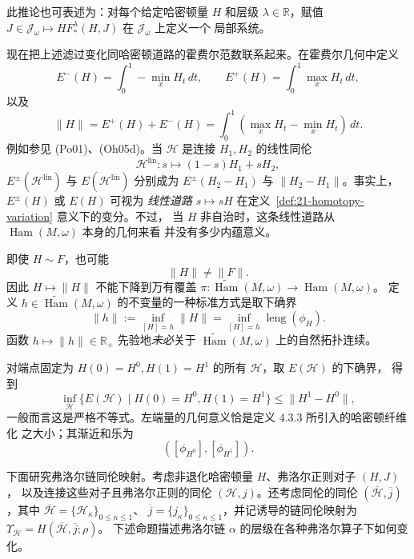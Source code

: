 \begin{remark}
\label{rem:21-filtered-local-system}
此推论也可表述为：对每个给定哈密顿量 $H$ 和层级 $\lambda\in\mathbb R$，赋值
$J\in\mathcal J_\omega\mapsto HF_*^\lambda(H,J)$ 在 $\mathcal J_\omega$ 上定义一个
局部系统。
\end{remark}

现在把上述滤过变化同哈密顿道路的霍费尔范数联系起来。在霍费尔几何中定义
\[
 E^-(H)=\int_0^1-\min_xH_t\,dt,\qquad
 E^+(H)=\int_0^1\max_xH_t\,dt,
\]
以及
\[
 \lVert H\rVert=E^+(H)+E^-(H)
 =\int_0^1(\max_xH_t-\min_xH_t)\,dt.
\]
例如参见 (Po01)、(Oh05d)。当 $\mathcal H$ 是连接 $H_1,H_2$ 的线性同伦
\[
 \mathcal H^{\mathrm{lin}}:s\longmapsto(1-s)H_1+sH_2,
\]
$E^\pm(\mathcal H^{\mathrm{lin}})$ 与 $E(\mathcal H^{\mathrm{lin}})$ 分别成为
$E^\pm(H_2-H_1)$ 与 $\lVert H_2-H_1\rVert$。事实上，$E^\pm(H)$ 或 $E(H)$ 可视为
\emph{线性道路} $s\mapsto sH$ 在定义~\ref{def:21-homotopy-variation} 意义下的变分。不过，
当 $H$ 非自治时，这条线性道路从 $\operatorname{Ham}(M,\omega)$ 本身的几何来看
并没有多少内蕴意义。

\begin{remark}
\label{rem:21-hofer-norm-universal-cover}
即使 $H\sim F$，也可能
\[
 \lVert H\rVert\neq\lVert F\rVert.
\]
因此 $H\mapsto\lVert H\rVert$ 不能下降到万有覆盖
$\pi:\widetilde{\operatorname{Ham}}(M,\omega)\to\operatorname{Ham}(M,\omega)$。
定义 $h\in\widetilde{\operatorname{Ham}}(M,\omega)$ 的不变量的一种标准方式是取下确界
\begin{equation}
 \lVert h\rVert:=\inf_{[H]=h}\lVert H\rVert
 =\inf_{[H]=h}\operatorname{leng}(\phi_H).
 \label{eq:21-hofer-norm-cover}
\end{equation}
函数 $h\mapsto\lVert h\rVert\in\mathbb R_+$ 先验地\emph{未必}关于
$\widetilde{\operatorname{Ham}}(M,\omega)$ 上的自然拓扑连续。
\end{remark}

对端点固定为 $H(0)=H^0,H(1)=H^1$ 的所有 $\mathcal H$，取 $E(\mathcal H)$ 的下确界，
得到
\[
 \inf_{\mathcal H}\{E(\mathcal H)\mid H(0)=H^0,H(1)=H^1\}
 \leq\lVert H^1-H^0\rVert,
\]
一般而言这是严格不等式。左端量的几何意义恰是定义 4.3.3 所引入的哈密顿纤维化
之大小；其渐近和乐为
\[
 ([\phi_{H^0}],[\phi_{H^1}]).
\]

下面研究弗洛尔链同伦映射。考虑非退化哈密顿量 $H$、弗洛尔正则对子 $(H,J)$，
以及连接这些对子且弗洛尔正则的同伦 $(\mathcal H,j)$。还考虑同伦的同伦
$(\overline{\mathcal H},\overline j)$，其中
$\overline{\mathcal H}=\{\mathcal H_\kappa\}_{0\leq\kappa\leq1}$、
$\overline j=\{j_\kappa\}_{0\leq\kappa\leq1}$，并记诱导的链同伦映射为
$\Upsilon_{\overline{\mathcal H}}=H(\overline{\mathcal H},\overline j;\rho)$。
下述命题描述弗洛尔链 $\alpha$ 的层级在各种弗洛尔算子下如何变化。

